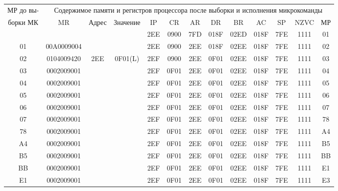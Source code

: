 \small{
\begin{flushleft}
    \begin{tabular}{|c|c|c|c|c|c|c|c|c|c|c|c|c|}
        \hline
        МР до вы- & \multicolumn{12}{1}{Содержимое памяти и регистров процессора после выборки и исполнения микрокоманды} \\
        \cline{2-13}
        борки МК & MR         & Адрес & Значение & IP  & CR   & AR  & DR   & BR   & AC   & SP  & NZVC & МР \\
        \hline
        &            &       &          & 2EE & 0900 & 7FD & 018F & 02ED & 018F & 7FE & 1111 & 01 \\
        \hline
        01       & 00A0009004 &       &          & 2EE & 0900 & 2EE & 018F & 02EE & 018F & 7FE & 1111 & 02 \\
        \hline
        02       & 0104009420 & 2EE   & 0F01(L)  & 2EF & 0900 & 2EE & 0F01 & 02EE & 018F & 7FE & 1111 & 03 \\
        \hline
        03       & 0002009001 &       &          & 2EF & 0F01 & 2EE & 0F01 & 02EE & 018F & 7FE & 1111 & 04 \\
        \hline
        04       & 0002009001 &       &          & 2EF & 0F01 & 2EE & 0F01 & 02EE & 018F & 7FE & 1111 & 05 \\
        \hline
        05       & 0002009001 &       &          & 2EF & 0F01 & 2EE & 0F01 & 02EE & 018F & 7FE & 1111 & 06 \\
        \hline
        06       & 0002009001 &       &          & 2EF & 0F01 & 2EE & 0F01 & 02EE & 018F & 7FE & 1111 & 07 \\
        \hline
        07       & 0002009001 &       &          & 2EF & 0F01 & 2EE & 0F01 & 02EE & 018F & 7FE & 1111 & 78 \\
        \hline
        78       & 0002009001 &       &          & 2EF & 0F01 & 2EE & 0F01 & 02EE & 018F & 7FE & 1111 & A4 \\
        \hline
        A4       & 0002009001 &       &          & 2EF & 0F01 & 2EE & 0F01 & 02EE & 018F & 7FE & 1111 & B5 \\
        \hline
        B5       & 0002009001 &       &          & 2EF & 0F01 & 2EE & 0F01 & 02EE & 018F & 7FE & 1111 & BB \\
        \hline
        BB       & 0002009001 &       &          & 2EF & 0F01 & 2EE & 0F01 & 02EE & 018F & 7FE & 1111 & E1 \\
        \hline
        E1       & 0002009001 &       &          & 2EF & 0F01 & 2EE & 0F01 & 02EE & 018F & 7FE & 1111 & E3 \\

\end{tabular}
\end{flushleft}}
